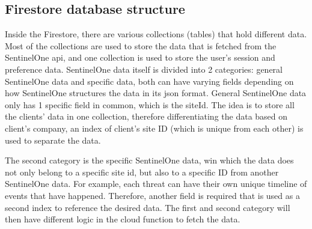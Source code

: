 \subsection{Firestore database structure}

Inside the Firestore, there are various collections (tables) that hold different data. Most of the collections are used to store the
data that is fetched from the SentinelOne \acrshort{api}, and one collection is used to store the user's session and preference data.
SentinelOne data itself is divided into 2 categories: general SentinelOne data and specific data, both can have varying fields
depending on how SentinelOne structures the data in its \acrshort{json} format. General SentinelOne data only has 1 specific field
in common, which is the siteId. The idea is to store all the clients' data in one collection, therefore differentiating the data
based on client's company, an index of client's site ID (which is unique from each other) is used to separate the data.

The second category is the specific SentinelOne data, win which the data does not only belong to a specific site \acrshort{id}, but also to a
specific ID from another SentinelOne data. For example, each threat can have their own unique timeline of events that have happened.
Therefore, another field is required that is used as a second index to reference the desired data. The first and second category will
then have different logic in the cloud function to fetch the data.



